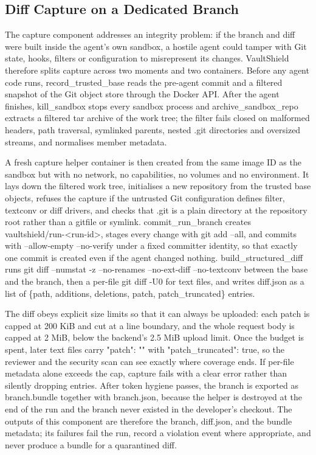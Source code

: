 \documentclass[12pt,a4paper,oneside]{report}
\begin{document}
\subsection{Diff Capture on a Dedicated Branch}\label{diff-capture-on-a-dedicated-branch}

The capture component addresses an integrity problem: if the branch and diff were built inside the agent's own sandbox, a hostile agent could tamper with Git state, hooks, filters or configuration to misrepresent its changes. VaultShield therefore splits capture across two moments and two containers. Before any agent code runs, record\_\allowbreak{}trusted\_\allowbreak{}base reads the pre-agent commit and a filtered snapshot of the Git object store through the Docker API. After the agent finishes, kill\_\allowbreak{}sandbox stops every sandbox process and archive\_\allowbreak{}sandbox\_\allowbreak{}repo extracts a filtered tar archive of the work tree; the filter fails closed on malformed headers, path traversal, symlinked parents, nested .git directories and oversized streams, and normalises member metadata.

A fresh capture helper container is then created from the same image ID as the sandbox but with no network, no capabilities, no volumes and no environment. It lays down the filtered work tree, initialises a new repository from the trusted base objects, refuses the capture if the untrusted Git configuration defines filter, textconv or diff drivers, and checks that .git is a plain directory at the repository root rather than a gitfile or symlink. commit\_\allowbreak{}run\_\allowbreak{}branch creates vaultshield/run-<run-id>, stages every change with git add --all, and commits with --allow-empty --no-verify under a fixed committer identity, so that exactly one commit is created even if the agent changed nothing. build\_\allowbreak{}structured\_\allowbreak{}diff runs git diff --numstat -z --no-renames --no-ext-diff --no-textconv between the base and the branch, then a per-file git diff -U0 for text files, and writes diff.json as a list of \{path, additions, deletions, patch, patch\_\allowbreak{}truncated\} entries.

The diff obeys explicit size limits so that it can always be uploaded: each patch is capped at 200 KiB and cut at a line boundary, and the whole request body is capped at 2 MiB, below the backend's 2.5 MiB upload limit. Once the budget is spent, later text files carry "patch": "" with "patch\_\allowbreak{}truncated": true, so the reviewer and the security scan can see exactly where coverage ends. If per-file metadata alone exceeds the cap, capture fails with a clear error rather than silently dropping entries. After token hygiene passes, the branch is exported as branch.bundle together with branch.json, because the helper is destroyed at the end of the run and the branch never existed in the developer's checkout. The outputs of this component are therefore the branch, diff.json, and the bundle metadata; its failures fail the run, record a violation event where appropriate, and never produce a bundle for a quarantined diff.
\end{document}

